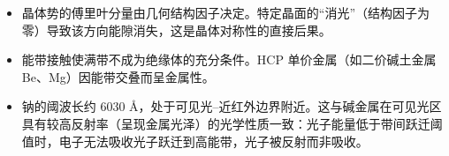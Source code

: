 \begin{insightbox}[物理图像]
\begin{itemize}
    \item 晶体势的傅里叶分量由几何结构因子决定。特定晶面的``消光''（结构因子为零）导致该方向能隙消失，这是晶体对称性的直接后果。
    \item 能带接触使满带不成为绝缘体的充分条件。HCP 单价金属（如二价碱土金属 Be、Mg）因能带交叠而呈金属性。
    \item 钠的阈波长约 6030 \AA，处于可见光--近红外边界附近。这与碱金属在可见光区具有较高反射率（呈现金属光泽）的光学性质一致：光子能量低于带间跃迁阈值时，电子无法吸收光子跃迁到高能带，光子被反射而非吸收。
\end{itemize}
\end{insightbox}
